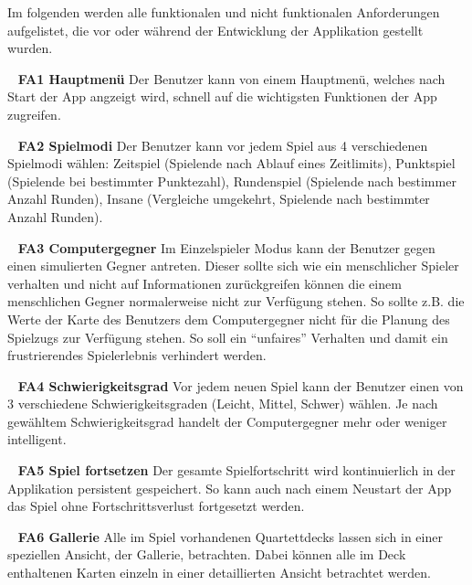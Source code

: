 \documentclass{scrartcl}
\begin{document}
Im folgenden werden alle funktionalen und nicht funktionalen Anforderungen
aufgelistet, die vor oder während der Entwicklung der Applikation gestellt wurden.

\ \newline
\textbf{FA1 Hauptmenü} \newline
Der Benutzer kann von einem Hauptmenü, welches nach Start der App angzeigt wird,
schnell auf die wichtigsten Funktionen der App zugreifen.

\ \newline
\textbf{FA2 Spielmodi} \newline
Der Benutzer kann vor jedem Spiel aus 4 verschiedenen Spielmodi wählen: Zeitspiel
(Spielende nach Ablauf eines Zeitlimits), Punktspiel (Spielende bei bestimmter
Punktezahl), Rundenspiel (Spielende nach bestimmer Anzahl Runden), Insane
(Vergleiche umgekehrt, Spielende nach bestimmter Anzahl Runden).

\ \newline
\textbf{FA3 Computergegner} \newline
Im Einzelspieler Modus kann der Benutzer gegen einen simulierten Gegner antreten.
Dieser sollte sich wie ein menschlicher Spieler verhalten und nicht auf
Informationen zurückgreifen können die einem menschlichen Gegner normalerweise
nicht zur Verfügung stehen. So sollte z.B. die Werte der Karte des Benutzers dem
Computergegner nicht für die Planung des Spielzugs zur Verfügung stehen. So soll
ein \enquote{unfaires} Verhalten und damit ein frustrierendes Spielerlebnis
verhindert werden.

\ \newline
\textbf{FA4 Schwierigkeitsgrad} \newline
Vor jedem neuen Spiel kann der Benutzer einen von 3 verschiedene
Schwierigkeitsgraden (Leicht, Mittel, Schwer) wählen. Je nach gewähltem
Schwierigkeitsgrad handelt der Computergegner mehr oder weniger intelligent.

\ \newline
\textbf{FA5 Spiel fortsetzen} \newline
Der gesamte Spielfortschritt wird kontinuierlich in der Applikation persistent
gespeichert. So kann auch nach einem Neustart der App das Spiel ohne
Fortschrittsverlust fortgesetzt werden.

\ \newline
\textbf{FA6 Gallerie} \newline
Alle im Spiel vorhandenen Quartettdecks lassen sich in einer speziellen Ansicht,
der Gallerie, betrachten. Dabei können alle im Deck enthaltenen Karten einzeln
in einer detaillierten Ansicht betrachtet werden.
\end{document}
